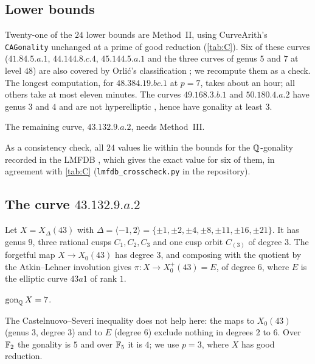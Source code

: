 \subsection{Lower bounds}
Twenty-one of the $24$ lower bounds are Method~II, using CurveArith's \texttt{CAGonality} unchanged at a prime
of good reduction (\cref{tab:C}). Six of these curves ($41.84.5.a.1$, $44.144.8.c.4$, $45.144.5.a.1$ and the
three curves of genus $5$ and $7$ at level $48$) are also covered by Orli\'c's classification
\cite{Orlic2025}; we recompute them as a check. The longest computation, for $48.384.19.bc.1$ at $p=7$, takes
about an hour; all others take at most eleven minutes. The curves $49.168.3.b.1$ and $50.180.4.a.2$ have
genus $3$ and $4$ and are not hyperelliptic \cite[Theorem~3.6]{JeonKimSchweizer2020}, hence have gonality at least $3$.

The remaining curve, $43.132.9.a.2$, needs Method~III.

As a consistency check, all $24$ values lie within the bounds for the $\mathbb{Q}$-gonality recorded in the LMFDB
\cite{LMFDB}, which gives the exact value for six of them, in agreement with \cref{tab:C}
(\texttt{lmfdb\_crosscheck.py} in the repository).

\subsection{The curve \texorpdfstring{$43.132.9.a.2$}{43.132.9.a.2}}
Let $X=X_\Delta(43)$ with $\Delta=\langle-1,2\rangle=\{\pm1,\pm2,\pm4,\pm8,\pm11,\pm16,\pm21\}$. It has genus
$9$, three rational cusps $C_1,C_2,C_3$ and one cusp orbit $C_{(3)}$ of degree $3$. The forgetful map
$X\to X_0(43)$ has degree $3$, and composing with the quotient by the Atkin--Lehner involution gives
$\pi\colon X\to X_0^+(43)=E$, of degree $6$, where $E$ is the elliptic curve $43a1$ of rank $1$.

\begin{proposition}\label{prop:43}
$\operatorname{gon}_{\mathbb{Q}} X=7$.
\end{proposition}

The Castelnuovo--Severi inequality does not help here: the maps to $X_0(43)$ (genus $3$, degree $3$) and to
$E$ (degree $6$) exclude nothing in degrees $2$ to $6$. Over $\mathbb{F}_2$ the gonality is $5$ and over $\mathbb{F}_5$ it is
$4$; we use $p=3$, where $X$ has good reduction.

